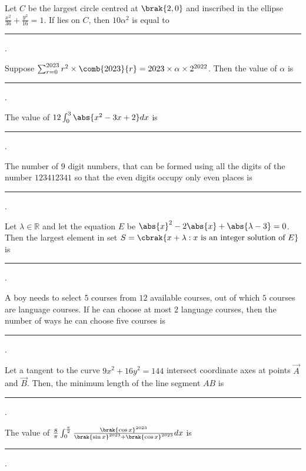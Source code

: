 \iffalse
\title{2023}
\author{EE24Btech11024}
\section{integer}
\fi

\item Let $C$ be the largest circle centred at $\brak{2,0}$ and inscribed in the ellipse $\frac{x^2}{36}+\frac{y^2}{16}=1$. If  lies on $C$, then $10\alpha^2$ is equal to \rule{1cm}{0.15mm}.

\hfill{}

\item Suppose $\sum_{r=0}^{2023}r^2\times\comb{2023}{r} = 2023\times\alpha\times 2^{2022}$. Then the value of $\alpha$ is \rule{1cm}{0.15mm}.

\hfill{}

\item The value of $12\int_{0}^{3}\abs{x^2-3x+2}dx$ is \rule{1cm}{0.15mm}.

\hfill{}

\item The number of $9$ digit numbers, that can be formed using all the digits of the number $123412341$ so that the even digits occupy only even places is \rule{1cm}{0.15mm}.

\hfill{}

\item Let $\lambda \in \mathbb{R}$ and let the equation $E$ be $\abs{x}^2-2\abs{x}+\abs{\lambda-3}=0$. Then the largest element in set $S=\cbrak{x+\lambda:x\text{ is an integer solution of }E}$ is \rule{1cm}{0.15mm}.

\hfill{}

\item A boy needs to select $5$ courses from $12$ available courses, out of which $5$ courses are language courses. If  he can choose at most $2$ language courses, then the number of ways he can choose five courses is \rule{1cm}{0.15mm}.

\hfill{}

\item Let a tangent to the curve $9x^2+16y^2=144$ intersect coordinate axes at points $\vec{A}$ and $\vec{B}$. Then, the minimum length of the line segment $AB$ is \rule{1cm}{0.15mm}.

\hfill{}

\item The value of $\frac{8}{\pi}\int_{0}^{\frac{\pi}{2}}\frac{\brak{\cos x}^{2023}}{\brak{\sin x}^{2023}+\brak{\cos x}^{2023}}dx$ is \rule{1cm}{0.15mm}. 

